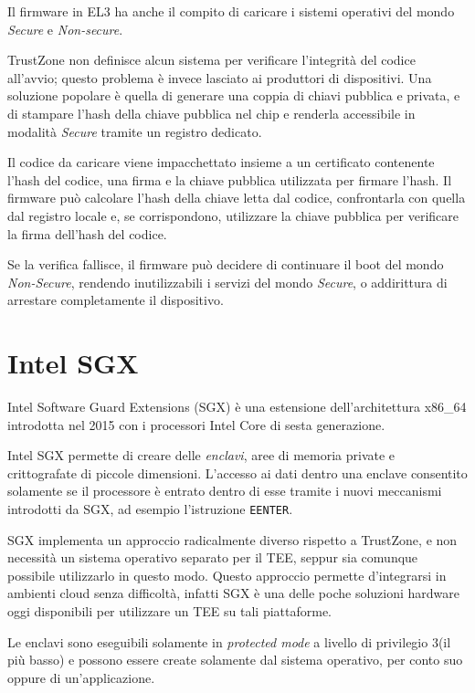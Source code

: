 \documentclass[12pt,italian]{report}
\begin{document}
\medbreak \noindent

Il firmware in EL3 ha anche il compito di caricare i sistemi operativi
del mondo \emph{Secure} e \emph{Non-secure}.

TrustZone non definisce alcun sistema per verificare l'integrità del codice
all'avvio; questo problema è invece lasciato ai produttori di dispositivi.
Una soluzione popolare è quella di generare una coppia di chiavi pubblica
e privata, e di stampare l'hash della chiave pubblica nel chip e renderla
accessibile in modalità \emph{Secure} tramite un registro dedicato.

Il codice da caricare viene impacchettato insieme a un certificato
contenente l'hash del codice, una firma e la chiave pubblica utilizzata
per firmare l'hash.
Il firmware può calcolare l'hash della chiave letta dal codice, confrontarla
con quella dal registro locale e, se corrispondono, utilizzare la
chiave pubblica per verificare la firma dell'hash del codice.

Se la verifica fallisce, il firmware può decidere di continuare il boot
del mondo \emph{Non-Secure}, rendendo inutilizzabili i servizi del mondo
\emph{Secure}, o addirittura di arrestare completamente il dispositivo.

\section{Intel SGX}
\label{sec:intel-sgx}
Intel Software Guard Extensions (SGX) è una estensione
dell'architettura x86\_64 introdotta nel 2015 con i processori
Intel Core di sesta generazione.

Intel SGX permette di creare delle \textit{enclavi}, aree di
memoria private e crittografate di piccole dimensioni.
L'accesso ai dati dentro una enclave consentito solamente se
il processore è entrato dentro di esse tramite i nuovi meccanismi
introdotti da SGX, ad esempio l'istruzione \texttt{EENTER}.

SGX implementa un approccio radicalmente diverso rispetto a TrustZone, e
non necessità un sistema operativo separato per il TEE, seppur sia comunque
possibile utilizzarlo in questo modo.
Questo approccio permette d'integrarsi in ambienti cloud senza difficoltà,
infatti SGX è una delle poche soluzioni hardware oggi disponibili
per utilizzare un TEE su tali piattaforme.

Le enclavi sono eseguibili solamente in \textit{protected mode}
a livello di privilegio $3$(il più basso) e possono essere create
solamente dal sistema operativo, per conto suo oppure di un'applicazione.
\end{document}
